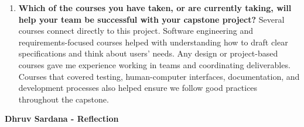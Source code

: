 \documentclass[12pt]{article}
\begin{document}
\begin{enumerate}
  \item \textbf{Which of the courses you have taken, or are currently
      taking, will help your team be successful with your capstone
    project?} \newline
    Several courses connect directly to this project. Software
    engineering and requirements-focused courses helped with
    understanding how to draft clear specifications and think about
    users' needs. Any design or project-based courses gave me
    experience working in teams and coordinating deliverables.
    Courses that covered testing, human-computer interfaces,
    documentation, and development
    processes also helped ensure we follow good practices
    throughout the capstone.
\end{enumerate}

\textbf{Dhruv Sardana - Reflection}
\end{document}

